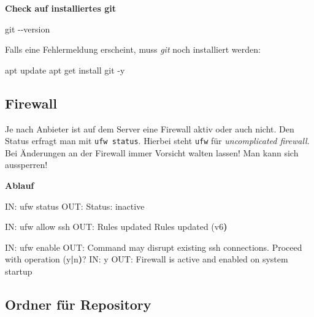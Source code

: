\documentclass[
  letterpaper,
  DIV=11]{scrreprt}
\newenvironment{Shaded}{\begin{snugshade}}{\end{snugshade}}
\newcommand{\AttributeTok}[1]{\textcolor[rgb]{0.40,0.45,0.13}{#1}}
\newcommand{\ErrorTok}[1]{\textcolor[rgb]{0.68,0.00,0.00}{#1}}
\newcommand{\ExtensionTok}[1]{\textcolor[rgb]{0.00,0.23,0.31}{#1}}
\newcommand{\FunctionTok}[1]{\textcolor[rgb]{0.28,0.35,0.67}{#1}}
\newcommand{\KeywordTok}[1]{\textcolor[rgb]{0.00,0.23,0.31}{\textbf{#1}}}
\newcommand{\NormalTok}[1]{\textcolor[rgb]{0.00,0.23,0.31}{#1}}
\newcommand{\git}{\textit{git}\xspace}
\begin{document}
\textbf{Check auf installiertes git}

\begin{Shaded}
\begin{Highlighting}[]
\FunctionTok{git} \AttributeTok{{-}{-}version}
\end{Highlighting}
\end{Shaded}

Falls eine Fehlermeldung erscheint, muss \git noch installiert werden:

\begin{Shaded}
\begin{Highlighting}[]
\ExtensionTok{apt}\NormalTok{ update }
\ExtensionTok{apt}\NormalTok{ get install git }\AttributeTok{{-}y}
\end{Highlighting}
\end{Shaded}

\subsection{Firewall}\label{firewall}

Je nach Anbieter ist auf dem Server eine Firewall aktiv oder auch nicht.
Den Status erfragt man mit \texttt{ufw\ status}. Hierbei steht
\texttt{ufw} für \emph{uncomplicated firewall}. Bei Änderungen an der
Firewall immer Vorsicht walten lassen! Man kann sich aussperren!

\textbf{Ablauf}

\begin{Shaded}
\begin{Highlighting}[]
\ExtensionTok{IN:}\NormalTok{   ufw status}
\ExtensionTok{OUT:}\NormalTok{  Status: inactive}

\ExtensionTok{IN:}\NormalTok{   ufw allow ssh }
\ExtensionTok{OUT:}\NormalTok{  Rules updated}
      \ExtensionTok{Rules}\NormalTok{ updated }\ErrorTok{(}\ExtensionTok{v6}\KeywordTok{)}

\ExtensionTok{IN:}\NormalTok{   ufw enable}
\ExtensionTok{OUT:}\NormalTok{  Command may disrupt existing ssh connections. }
      \ExtensionTok{Proceed}\NormalTok{ with operation }\ErrorTok{(}\ExtensionTok{y}\KeywordTok{|}\ExtensionTok{n}\KeywordTok{)}\ExtensionTok{?}
\ExtensionTok{IN:}\NormalTok{   y}
\ExtensionTok{OUT:}\NormalTok{  Firewall is active and enabled on system startup}
\end{Highlighting}
\end{Shaded}

\subsection{Ordner für Repository}\label{ordner-fuxfcr-repository}
\end{document}
